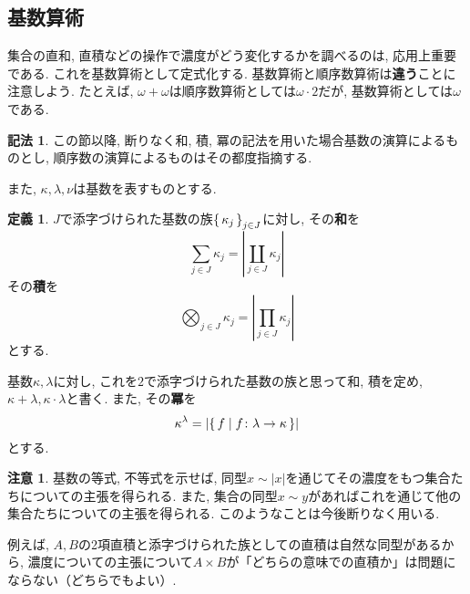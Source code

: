 \documentclass[a4paper, twoside]{bxjsarticle}
\newcommand{\abs}[1]{\left\lvert#1\right\rvert}
\theoremstyle{definition}
\newtheorem{defn}[thm]{定義}
\newtheorem{rem}[thm]{注意}
\newtheorem{notation}[thm]{記法}
\begin{document}
    \subsection{基数算術}
        集合の直和, 直積などの操作で濃度がどう変化するかを調べるのは, 応用上重要である. これを基数算術として定式化する. 基数算術と順序数算術は\textbf{違う}ことに注意しよう. たとえば, $\omega+\omega$は順序数算術としては$\omega\cdot2$だが, 基数算術としては$\omega$である.  
        \begin{notation}
            この節以降, 断りなく和, 積, 冪の記法を用いた場合基数の演算によるものとし, 順序数の演算によるものはその都度指摘する.
            
            また, $\kappa, \lambda, \nu$は基数を表すものとする.
        \end{notation}
        \begin{defn}
            $J$で添字づけられた基数の族$\set{\kappa_j}_{j\in J}$に対し, その\textbf{和}を\[\sum_{j\in J}\kappa_j = \abs{\coprod_{j\in J}\kappa_j}\]その\textbf{積}を\[\bigotimes_{j\in J}\kappa_j = \abs{\prod_{j\in J}\kappa_j}\]とする.
            
            基数$\kappa, \lambda$に対し, これを$2$で添字づけられた基数の族と思って和, 積を定め, $\kappa+\lambda, \kappa\cdot\lambda$と書く. また, その\textbf{冪}を\[\kappa^\lambda = \abs{\set{f|f\colon \lambda\to\kappa}}\]とする. 
        \end{defn}
        \begin{rem}
            基数の等式, 不等式を示せば, 同型$x\sim \abs{x}$を通じてその濃度をもつ集合たちについての主張を得られる. また, 集合の同型$x\sim y$があればこれを通じて他の集合たちについての主張を得られる. このようなことは今後断りなく用いる.
            
            例えば, $A, B$の2項直積と添字づけられた族としての直積は自然な同型があるから, 濃度についての主張について$A\times B$が「どちらの意味での直積か」は問題にならない（どちらでもよい）.
        \end{rem}
\end{document}
